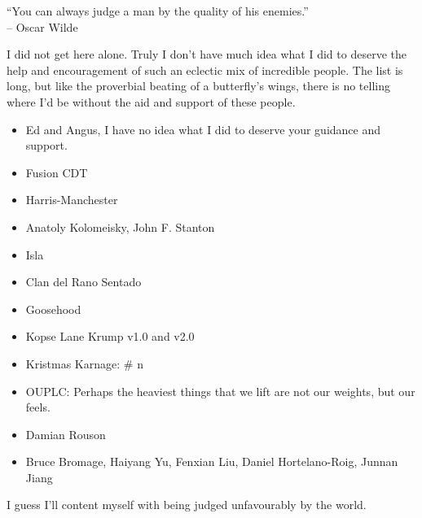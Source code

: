 \begin{frontmatter}[Acknowledgements]
    \centering
    ``You can always judge a man by the quality of his enemies.''\\
    -- Oscar Wilde

    \justify
    I did not get here alone. Truly I don't have much idea what I did to deserve the help and encouragement of such an eclectic mix of incredible people. The list is long, but like the proverbial beating of a butterfly's wings, there is no telling where I'd be without the aid and support of these people.

    \begin{itemize}
        \item Ed and Angus, I have no idea what I did to deserve your guidance and support.
        \item Fusion CDT
        \item Harris-Manchester
        \item Anatoly Kolomeisky, John F. Stanton
        \item Isla
        \item Clan del Rano Sentado
        \item Goosehood
        \item Kopse Lane Krump v1.0 and v2.0
        \item Kristmas Karnage: \# n
        \item OUPLC: Perhaps the heaviest things that we lift are not our weights, but our feels.
        \item Damian Rouson
        \item Bruce Bromage, Haiyang Yu, Fenxian Liu, Daniel Hortelano-Roig, Junnan Jiang
    \end{itemize}

    I guess I'll content myself with being judged unfavourably by the world.
\end{frontmatter}